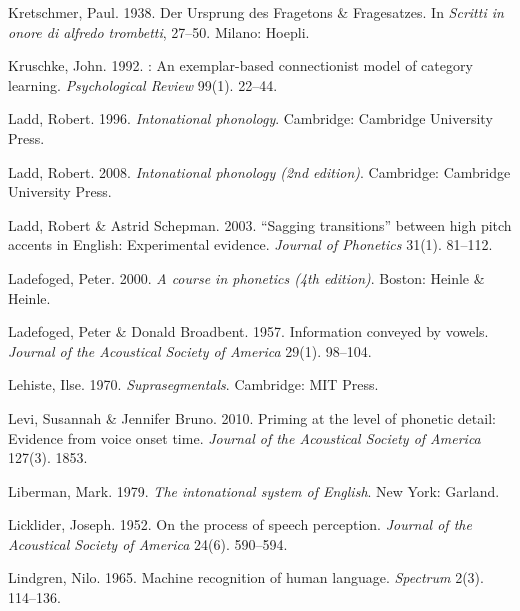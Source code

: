 \documentclass[ number=1
,series=labphon
,output=long
,url=http://langsci-press.org/catalog/book/16
,isbn=978-3-944675-01-5
]{LSP/langsci}
\begin{document}
\begin{thebibliography}{284}
Kretschmer, Paul. 1938.
\newblock Der {U}rsprung des {F}ragetons \& {F}ragesatzes.
\newblock In \emph{Scritti in onore di alfredo trombetti}, 27--50. Milano:
  Hoepli.

Kruschke, John. 1992.
: {A}n exemplar-based connectionist model of category
  learning.
\newblock \emph{Psychological Review} 99(1). 22--44.

Ladd, Robert. 1996.
\newblock \emph{Intonational phonology}.
\newblock Cambridge: Cambridge University Press.

Ladd, Robert. 2008.
\newblock \emph{Intonational phonology (2nd edition)}.
\newblock Cambridge: Cambridge University Press.

Ladd, Robert \& Astrid Schepman. 2003.
\newblock ``{S}agging transitions'' between high pitch accents in {E}nglish:
  {E}xperimental evidence.
\newblock \emph{Journal of Phonetics} 31(1). 81--112.

Ladefoged, Peter. 2000.
\newblock \emph{A course in phonetics (4th edition)}.
\newblock Boston: Heinle \& Heinle.

Ladefoged, Peter \& Donald Broadbent. 1957.
\newblock Information conveyed by vowels.
\newblock \emph{Journal of the Acoustical Society of America} 29(1). 98--104.

Lehiste, Ilse. 1970.
\newblock \emph{Suprasegmentals}.
\newblock Cambridge: MIT Press.

Levi, Susannah \& Jennifer Bruno. 2010.
\newblock Priming at the level of phonetic detail: {E}vidence from voice onset
  time.
\newblock \emph{Journal of the Acoustical Society of America} 127(3). 1853.

Liberman, Mark. 1979.
\newblock \emph{The intonational system of {E}nglish}.
\newblock New York: Garland.

Licklider, Joseph. 1952.
\newblock On the process of speech perception.
\newblock \emph{Journal of the Acoustical Society of America} 24(6). 590--594.

Lindgren, Nilo. 1965.
\newblock Machine recognition of human language.
\newblock \emph{Spectrum} 2(3). 114--136.


\end{thebibliography}
\end{document}
